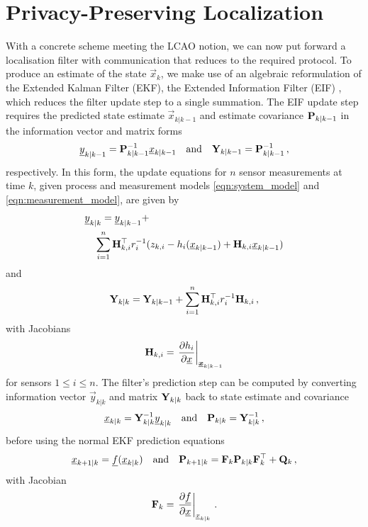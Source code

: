 \documentclass[10pt,letterpaper,oneside,twocolumn,journal]{IEEEtran}
\theoremstyle{definition}
\theoremstyle{definition}
\theoremstyle{remark}
\begin{document}
\section{Privacy-Preserving Localization} \label{sec:priv_localization}
With a concrete scheme meeting the LCAO notion, we can now put forward a localisation filter with communication that reduces to the required protocol. To produce an estimate of the state $\vec{x}_k$, we make use of an algebraic reformulation of the Extended Kalman Filter (EKF), the Extended Information Filter (EIF) \cite{maybeckStochasticModelsEstimation1982}, which reduces the filter update step to a single summation. The EIF update step requires the predicted state estimate $\vec{x}_{k|k-1}$ and estimate covariance ${{\mathbf{P}}}_{k|k-1}$ in the information vector and matrix forms
\begin{equation}
    {\underline{y}}_{k|k-1} = {{\mathbf{P}}}_{k|k-1}^{-1}{\underline{x}}_{k|k-1} \quad\textrm{and}\quad {\ensuremath{{\mathbf{Y}}}}_{k|k-1} = {{\mathbf{P}}}_{k|k-1}^{-1}\,,
\end{equation}
respectively. In this form, the update equations for $n$ sensor measurements at time $k$, given process and measurement models \eqref{eqn:system_model} and \eqref{eqn:measurement_model}, are given by
\begin{equation}
    \begin{split}
        &\vec{y}_{k|k} = \vec{y}_{k|k-1} + \\
        &\quad \sum^n_{i=1}\mat{H}^\top_{k,i} r^{-1}_i (z_{k,i} - h_i(\vec{x}_{k|k-1}) + \mat{H}_{k,i}\vec{x}_{k|k-1})
    \end{split} \label{eqn:eif_info_vec_update}
\end{equation}
and
\begin{equation}
    \mat{Y}_{k|k} = \mat{Y}_{k|k-1} + \sum^n_{i=1}\mat{H}^\top_{k,i} r^{-1}_i \mat{H}_{k,i}\,, \label{eqn:eif_info_mat_update}
\end{equation}
with Jacobians
\begin{equation}
    \mat{H}_{k,i} = \left.\frac{\partial h_i}{\partial \vec{x}}\right|_{\rvec{x}_{k|k-1}} \label{eqn:measurement_jacobian}
\end{equation}
for sensors $1 \leq i \leq n$. The filter's prediction step can be computed by converting information vector $\vec{y}_{k|k}$ and matrix ${{\mathbf{Y}}}_{k|k}$ back to state estimate and covariance 
\begin{equation}
    {\underline{x}}_{k|k} = {{\mathbf{Y}}}_{k|k}^{-1}{\underline{y}}_{k|k} \quad\textrm{and}\quad {\ensuremath{{\mathbf{P}}}}_{k|k} = {{\mathbf{Y}}}_{k|k}^{-1}\,,
\end{equation}
before using the normal EKF prediction equations
\begin{equation}
    \vec{x}_{k+1|k} = \vec{f}(\vec{x}_{k|k}) \quad\textrm{and}\quad \mat{P}_{k+1|k} = \mat{F}_k\mat{P}_{k|k}\mat{F}_k^\top + \mat{Q}_k\,, \label{eqn:ekf_prediction}
\end{equation}
with Jacobian
\begin{equation}
    \mat{F}_{k} = \left.\frac{\partial \vec{f}}{\partial \vec{x}}\right|_{\vec{x}_{k|k}}\,. \label{eqn:jacobian_f}
\end{equation}
\end{document}
